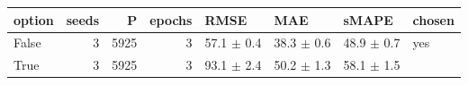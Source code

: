 \begin{tabular}{lrrrllll}
\toprule
option & seeds & P & epochs & RMSE & MAE & sMAPE & chosen \\
\midrule
False & 3 & 5925 & 3 & 57.1 $\pm$ 0.4 & 38.3 $\pm$ 0.6 & 48.9 $\pm$ 0.7 & yes \\
True & 3 & 5925 & 3 & 93.1 $\pm$ 2.4 & 50.2 $\pm$ 1.3 & 58.1 $\pm$ 1.5 &  \\
\bottomrule
\end{tabular}
